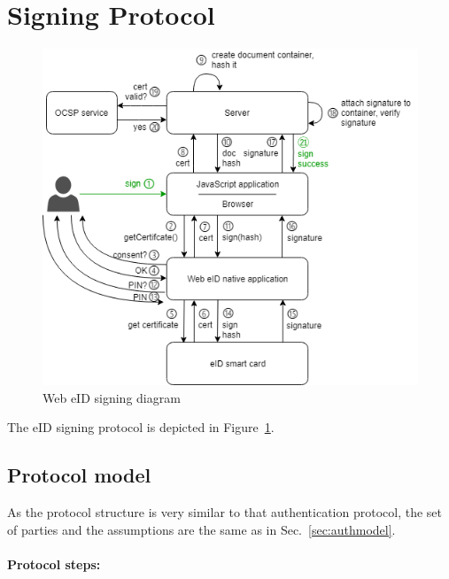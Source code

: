 \section{Signing Protocol}
\begin{figure}
\includegraphics[width=\textwidth]{img/signing.png}
\caption{Web eID signing diagram}\label{fig:sign}
\end{figure}

The eID signing protocol is depicted in Figure~\ref{fig:sign}.

\subsection{Protocol model}

As the protocol structure is very similar to that authentication protocol, the set of parties and the assumptions are the same as in Sec.~\ref{sec:authmodel}.

\paragraph{Protocol steps:}

